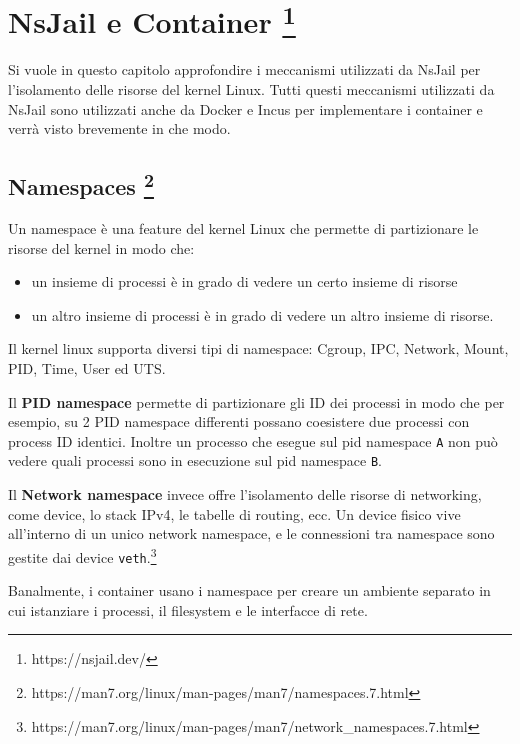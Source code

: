\section[NsJail e Container ]{\texorpdfstring{NsJail e Container
\footnote{\label{fn:ref_30}https://nsjail.dev/}}{NsJail e Container }}\label{nsjail-e-container-1}

Si vuole in questo capitolo approfondire i meccanismi utilizzati da
NsJail per l'isolamento delle risorse del kernel Linux. Tutti questi
meccanismi utilizzati da NsJail sono utilizzati anche da Docker e Incus
per implementare i container e verrà visto brevemente in che modo.

\subsection[Namespaces ]{\texorpdfstring{Namespaces
\footnote{\label{fn:ref_31}https://man7.org/linux/man-pages/man7/namespaces.7.html}}{Namespaces }}\label{namespaces-2}

Un namespace è una feature del kernel Linux che permette di partizionare
le risorse del kernel in modo che:

\begin{itemize}
\tightlist
\item
  un insieme di processi è in grado di vedere un certo insieme di
  risorse
\item
  un altro insieme di processi è in grado di vedere un altro insieme di
  risorse.
\end{itemize}

Il kernel linux supporta diversi tipi di namespace: Cgroup, IPC,
Network, Mount, PID, Time, User ed UTS.

Il \textbf{PID namespace} permette di partizionare gli ID dei processi
in modo che per esempio, su 2 PID namespace differenti possano
coesistere due processi con process ID identici. Inoltre un processo che
esegue sul pid namespace \passthrough{\lstinline!A!} non può vedere
quali processi sono in esecuzione sul pid namespace
\passthrough{\lstinline!B!}.

Il \textbf{Network namespace} invece offre l'isolamento delle risorse di
networking, come device, lo stack IPv4, le tabelle di routing, ecc. Un
device fisico vive all'interno di un unico network namespace, e le
connessioni tra namespace sono gestite dai device
\passthrough{\lstinline!veth!}.\footnote{\label{fn:ref_32}https://man7.org/linux/man-pages/man7/network\_namespaces.7.html}

Banalmente, i container usano i namespace per creare un ambiente
separato in cui istanziare i processi, il filesystem e le interfacce di
rete.

